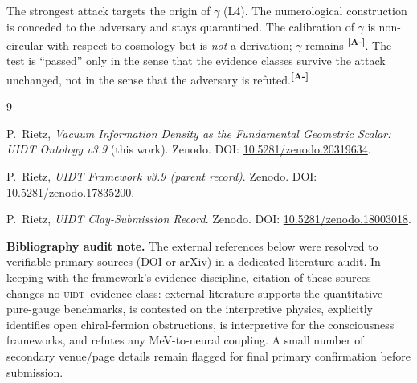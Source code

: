 \documentclass[12pt,a4paper,twoside]{article}
\theoremstyle{plain}
\theoremstyle{definition}
\theoremstyle{remark}
\newcommand{\UIDT}{\textsc{uidt}}
\newcommand{\catmark}[1]{\textsuperscript{\textsf{\textbf{[#1]}}}}
\begin{document}
\begin{governancebox}
The strongest attack targets the origin of $\gamma$ (L4). The numerological construction is conceded to the adversary and stays quarantined. The calibration of $\gamma$ is non-circular with respect to cosmology but is \emph{not} a derivation; $\gamma$ remains \catmark{A-}. The test is ``passed'' only in the sense that the evidence classes survive the attack unchanged, not in the sense that the adversary is refuted.\catmark{A-}
\end{governancebox}


\newpage
\begin{thebibliography}{9}
\footnotesize

P.~Rietz, \textit{Vacuum Information Density as the Fundamental Geometric Scalar: UIDT Ontology v3.9} (this work). Zenodo. DOI: \href{https://doi.org/10.5281/zenodo.20319634}{10.5281/zenodo.20319634}.

P.~Rietz, \textit{UIDT Framework v3.9 (parent record)}. Zenodo. DOI: \href{https://doi.org/10.5281/zenodo.17835200}{10.5281/zenodo.17835200}.

P.~Rietz, \textit{UIDT Clay-Submission Record}. Zenodo. DOI: \href{https://doi.org/10.5281/zenodo.18003018}{10.5281/zenodo.18003018}.

\textbf{Bibliography audit note.} The external references below were resolved to verifiable primary sources (DOI or arXiv) in a dedicated literature audit. In keeping with the framework's evidence discipline, citation of these sources changes no \UIDT\ evidence class: external literature supports the quantitative pure-gauge benchmarks, is contested on the interpretive physics, explicitly identifies open chiral-fermion obstructions, is interpretive for the consciousness frameworks, and refutes any MeV-to-neural coupling. A small number of secondary venue/page details remain flagged for final primary confirmation before submission.


\end{thebibliography}
\end{document}
